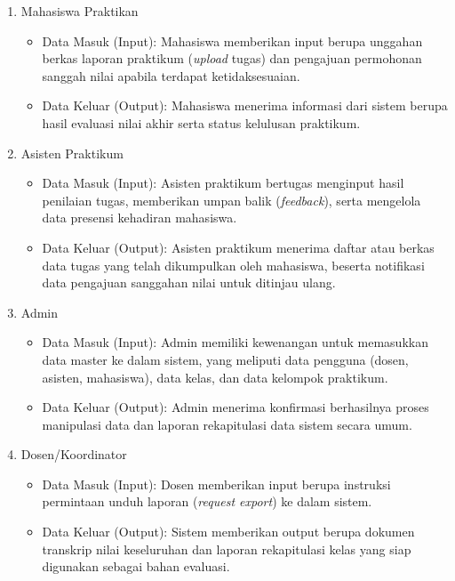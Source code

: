 \documentclass[12pt,a4paper,twoside]{report}
\begin{document}
\begin{enumerate}[nosep]
    \item Mahasiswa Praktikan
    \begin{itemize}[nosep]
        \item Data Masuk (Input): Mahasiswa memberikan input berupa unggahan berkas laporan praktikum (\textit{upload} tugas) dan pengajuan permohonan sanggah nilai apabila terdapat ketidaksesuaian.
        \item Data Keluar (Output): Mahasiswa menerima informasi dari sistem berupa hasil evaluasi nilai akhir serta status kelulusan praktikum.
    \end{itemize}
    \item Asisten Praktikum
    \begin{itemize}[nosep]
        \item Data Masuk (Input): Asisten praktikum bertugas menginput hasil penilaian tugas, memberikan umpan balik (\textit{feedback}), serta mengelola data presensi kehadiran mahasiswa.
        \item Data Keluar (Output): Asisten praktikum menerima daftar atau berkas data tugas yang telah dikumpulkan oleh mahasiswa, beserta notifikasi data pengajuan sanggahan nilai untuk ditinjau ulang.
    \end{itemize}
    \item Admin
    \begin{itemize}[nosep]
        \item Data Masuk (Input): Admin memiliki kewenangan untuk memasukkan data master ke dalam sistem, yang meliputi data pengguna (dosen, asisten, mahasiswa), data kelas, dan data kelompok praktikum.
        \item Data Keluar (Output): Admin menerima konfirmasi berhasilnya proses manipulasi data dan laporan rekapitulasi data sistem secara umum.
    \end{itemize}
    \item Dosen/Koordinator
    \begin{itemize}[nosep]
        \item Data Masuk (Input): Dosen memberikan input berupa instruksi permintaan unduh laporan (\textit{request export}) ke dalam sistem.
        \item Data Keluar (Output): Sistem memberikan output berupa dokumen transkrip nilai keseluruhan dan laporan rekapitulasi kelas yang siap digunakan sebagai bahan evaluasi.
    \end{itemize}
\end{enumerate}
\end{document}
